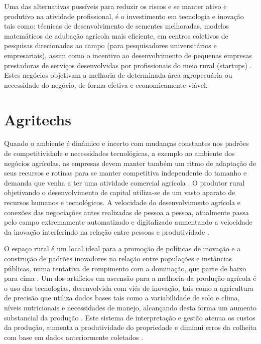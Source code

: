Uma das alternativas possíveis para reduzir os riscos e se manter ativo e produtivo na atividade profissional, é o investimento em tecnologia e inovação tais como: técnicas de desenvolvimento de sementes melhoradas, modelos matemáticos de adubação agrícola mais eficiente, em centros coletivos de pesquisas direcionadas ao campo (para pesquisadores universitários e empresariais), assim como o incentivo ao desenvolvimento de pequenas empresas prestadoras de serviços desenvolvidas por profissionais do meio rural (startups) \cite{bochi_dorneles_coletivos_2014, gomes_inovacao_2014}.
Estes negócios objetivam a melhoria de determinada área agropecuária \cite{volpato_agtechs_2019} ou necessidade do negócio, de forma efetiva e economicamente viável. 

\section{Agritechs}

Quando o ambiente é dinâmico e incerto  com mudanças constantes nos padrões de competitividade e necessidades tecnológicas, a exemplo ao ambiente dos negócios agrícolas, as empresas devem manter também um ritmo de adaptação de seus recursos e rotinas para se manter competitiva independente do tamanho e demanda que venha a ter uma atividade comercial agrícola \cite{fitz-koch_reciprocal_2017}. O produtor rural objetivando o desenvolvimento de capital utiliza-se de um vasto aparato de recursos humanos e tecnológicos. A velocidade do desenvolvimento agrícola e conexões das negociações antes realizadas de pessoa a pessoa, atualmente passa pelo campo extremamente automatizado e digitalizado aumentando a velocidade da inovação interferindo na relação entre pessoas e produtividade \cite{campos_o_2016}.


O espaço rural é um local ideal para a promoção de políticas de inovação e a construção de padrões inovadores na relação entre populações e instâncias públicas, numa tentativa de rompimento com a dominação, que parte de baixo para cima \cite{magruder_assessment_2018}.
Um dos artifícios em ascensão para a melhoria da produção agrícola é o uso das tecnologias, desenvolvida com viés de inovação, tais como a agricultura de precisão que utiliza dados bases tais como a variabilidade de solo e clima, níveis nutricionais e necessidades de manejo, alcançando desta forma um aumento substancial da produção \cite{barnes_exploring_2019}. Este sistema de interpretação e gestão atenua os custos da produção, aumenta a produtividade do propriedade e diminui erros da colheita com base em dados anteriormente coletados \cite{barnes_influencing_2018}.

